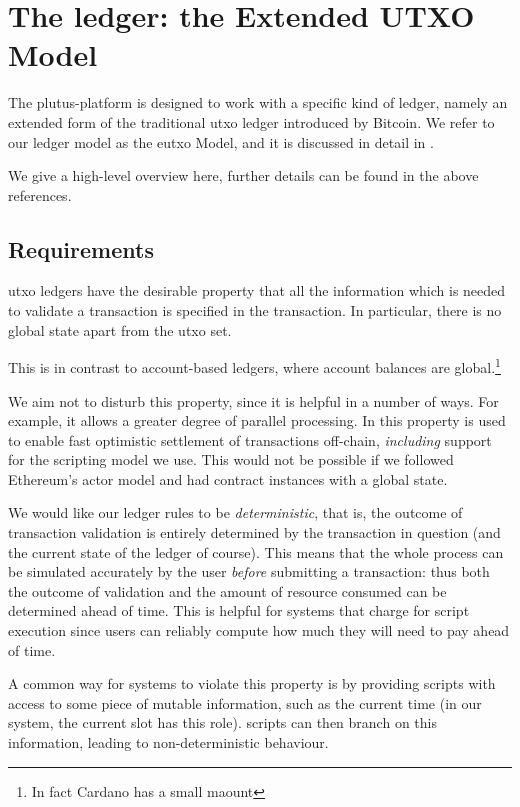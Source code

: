 \section{The ledger: the Extended UTXO Model}
\label{sec:ledger}

The \gls{plutus-platform} is designed to work with a specific kind of ledger, namely an extended form of the traditional \gls{utxo} ledger introduced by Bitcoin.
We refer to our ledger model as the \gls{eutxo} Model, and it is discussed in detail in \textcite{eutxo,utxoma,eutxoma}.

We give a high-level overview here, further details can be found in the above references.

\subsection{Requirements}
\begin{requirement}[Locality]
\label{req:ledger-locality}
\Gls{utxo} ledgers have the desirable property that all the information which is needed to validate a transaction is specified in the transaction.
In particular, there is no global state apart from the \gls{utxo} set.

This is in contrast to account-based ledgers, where account balances are global.\footnote{
  In fact Cardano has a small maount
}

We aim not to disturb this property, since it is helpful in a number of ways.
For example, it allows a greater degree of parallel processing.
In \textcite{chakravartyhydra} this property is used to enable fast optimistic settlement of transactions off-chain, \emph{including} support for the scripting model we use.
This would not be possible if we followed Ethereum's actor model and had contract instances with a global state.
\end{requirement}

\begin{requirement}[Determinism]
\label{req:ledger-determinism}
We would like our ledger rules to be \emph{deterministic}, that is, the outcome of transaction validation is entirely determined by the transaction in question (and the current state of the ledger of course).
This means that the whole process can be simulated accurately by the user \emph{before} submitting a transaction: thus both the outcome of validation and the amount of resource consumed can be determined ahead of time.
This is helpful for systems that charge for \gls{script} execution since users can reliably compute how much they will need to pay ahead of time.

A common way for systems to violate this property is by providing \glspl{script} with access to some piece of mutable information, such as the current time (in our system, the current slot has this role).
\Glspl{script} can then branch on this information, leading to non-deterministic behaviour.
\end{requirement}

